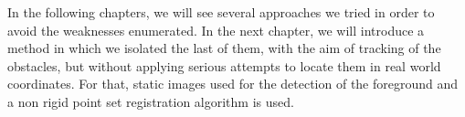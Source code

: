 In the following chapters, we will see several approaches we tried in order to avoid the weaknesses enumerated. In the next chapter, we will introduce a method in which we isolated the last of them, with the aim of tracking of the obstacles, but without applying serious attempts to locate them in real world coordinates. For that, static images used for the detection of the foreground and a non rigid point set registration algorithm is used.
























